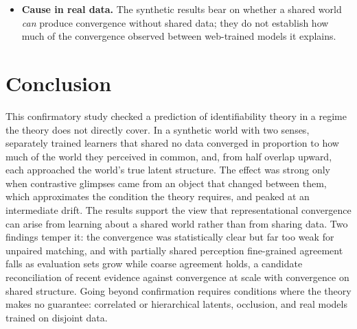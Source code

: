 \documentclass[11pt]{article}
\begin{document}
\begin{itemize}
  \item \textbf{Cause in real data.} The synthetic results bear on whether a shared world \emph{can} produce convergence without shared data; they do not establish how much of the convergence observed between web-trained models it explains.
\end{itemize}

\section{Conclusion}

This confirmatory study checked a prediction of identifiability theory in a regime the theory does not directly cover. In a synthetic world with two senses, separately trained learners that shared no data converged in proportion to how much of the world they perceived in common, and, from half overlap upward, each approached the world's true latent structure. The effect was strong only when contrastive glimpses came from an object that changed between them, which approximates the condition the theory requires, and peaked at an intermediate drift. The results support the view that representational convergence can arise from learning about a shared world rather than from sharing data. Two findings temper it: the convergence was statistically clear but far too weak for unpaired matching, and with partially shared perception fine-grained agreement falls as evaluation sets grow while coarse agreement holds, a candidate reconciliation of recent evidence against convergence at scale with convergence on shared structure. Going beyond confirmation requires conditions where the theory makes no guarantee: correlated or hierarchical latents, occlusion, and real models trained on disjoint data.
\end{document}
